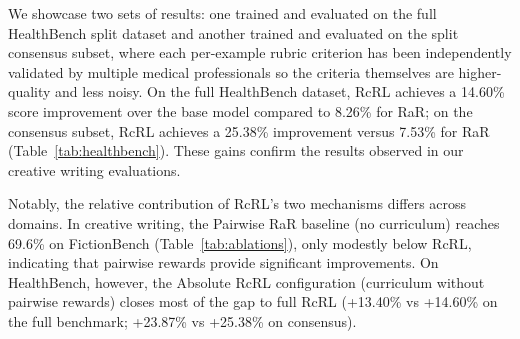 \documentclass{article}
\theoremstyle{plain}
\theoremstyle{definition}
\theoremstyle{remark}
\begin{document}
We showcase two sets of results: one trained and evaluated on the full HealthBench split dataset and another trained and evaluated on the split consensus subset, where each per-example rubric criterion has been independently validated by multiple medical professionals so the criteria themselves are higher-quality and less noisy. On the full HealthBench dataset, RcRL achieves a 14.60\% score improvement over the base model compared to 8.26\% for RaR; on the consensus subset, RcRL achieves a 25.38\% improvement versus 7.53\% for RaR (Table~\ref{tab:healthbench}). These gains confirm the results observed in our creative writing evaluations.

\begin{table}[h]
  \caption{\textbf{HealthBench cross-domain results.} Score improvement over Qwen 3 4B on full HealthBench and the consensus subset (criteria validated by multiple annotators). Best in \textbf{bold}.}
  \begin{center}
    \begin{small}
      \begin{sc}
      \end{sc}
    \end{small}
  \end{center}
  \label{tab:healthbench}
\end{table}

Notably, the relative contribution of RcRL's two mechanisms differs across domains. In creative writing, the Pairwise RaR baseline (no curriculum) reaches 69.6\% on FictionBench (Table~\ref{tab:ablations}), only modestly below RcRL, indicating that pairwise rewards provide significant improvements. On HealthBench, however, the Absolute RcRL configuration (curriculum without pairwise rewards) closes most of the gap to full RcRL (+13.40\% vs +14.60\% on the full benchmark; +23.87\% vs +25.38\% on consensus).
\end{document}
